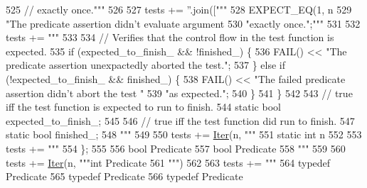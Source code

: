 \begin{DoxyCode}
{{{{{{{{{{{{{{{{{{{{{{{{{{{{{{{{{{{{{{{525 \textcolor{stringliteral}{    // exactly once."""}
526 
527   tests += \textcolor{stringliteral}{''}.join([\textcolor{stringliteral}{"""}
528 \textcolor{stringliteral}{    EXPECT\_EQ(1, n%
529 \textcolor{stringliteral}{        "The predicate assertion didn't evaluate argument %
530 \textcolor{stringliteral}{        "exactly once.";"""} %
531 
532   tests += \textcolor{stringliteral}{"""}
533 \textcolor{stringliteral}{}
534 \textcolor{stringliteral}{    // Verifies that the control flow in the test function is expected.}
535 \textcolor{stringliteral}{    if (expected\_to\_finish\_ && !finished\_) \{}
536 \textcolor{stringliteral}{      FAIL() << "The predicate assertion unexpactedly aborted the test.";}
537 \textcolor{stringliteral}{    \} else if (!expected\_to\_finish\_ && finished\_) \{}
538 \textcolor{stringliteral}{      FAIL() << "The failed predicate assertion didn't abort the test "}
539 \textcolor{stringliteral}{                "as expected.";}
540 \textcolor{stringliteral}{    \}}
541 \textcolor{stringliteral}{  \}}
542 \textcolor{stringliteral}{}
543 \textcolor{stringliteral}{  // true iff the test function is expected to run to finish.}
544 \textcolor{stringliteral}{  static bool expected\_to\_finish\_;}
545 \textcolor{stringliteral}{}
546 \textcolor{stringliteral}{  // true iff the test function did run to finish.}
547 \textcolor{stringliteral}{  static bool finished\_;}
548 \textcolor{stringliteral}{"""} %
549 
550   tests += \hyperlink{namespacegen__gtest__pred__impl_ac016218b7c9437d1d5ac85c574c83069}{Iter}(n, \textcolor{stringliteral}{"""}
551 \textcolor{stringliteral}{  static int n%
552 
553   tests += \textcolor{stringliteral}{"""}
554 \textcolor{stringliteral}{\};}
555 \textcolor{stringliteral}{}
556 \textcolor{stringliteral}{bool Predicate%
557 \textcolor{stringliteral}{bool Predicate%
558 \textcolor{stringliteral}{"""} %
559 
560   tests += \hyperlink{namespacegen__gtest__pred__impl_ac016218b7c9437d1d5ac85c574c83069}{Iter}(n, \textcolor{stringliteral}{"""int Predicate%
561 \textcolor{stringliteral}{"""}) %
562 
563   tests += \textcolor{stringliteral}{"""}
564 \textcolor{stringliteral}{typedef Predicate%
565 \textcolor{stringliteral}{typedef Predicate%
566 \textcolor{stringliteral}{typedef Predicate%
}}}}}}}}}}}}}}}}}}}}}}}}}}}}}}}}}}}}}}}}}}}}}}}}
\end{DoxyCode}
